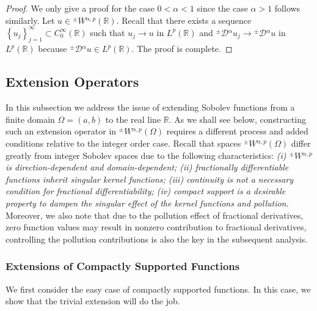 \documentclass[leqno,final]{siamltex}
\numberwithin{equation}{section}
\renewcommand{\(}{\bigl(}
\renewcommand{\)}{\bigr)}
\newcommand{\R}{\mathbb{R}}
\begin{document}
    \begin{proof}
        We only give a proof for the case $0<\alpha<1$ since the case $\alpha>1$ follows similarly. Let $u \in {^{\pm}}{W}{^{\alpha,p}}(\R)$. Recall that there exists a sequence $\left\{u_j \right\}_{j = 1}^{\infty} \subset C^{\infty}_{0}(\R)$ such that $u_j \rightarrow u$ in $L^{p}(\R)$ and ${^{\pm}}{\mathcal{D}}{^{\alpha}} u_j \rightarrow {^{\pm}}{\mathcal{D}}{^{\alpha}} u$ in $L^{p}(\R)$ because ${^{\pm}}{\mathcal{D}}{^{\alpha}} u \in L^{p}(\R)$. The proof is complete. 
    \end{proof}
    
    
    \subsection{Extension Operators}\label{sec-4.2}
    In this subsection we address the issue of extending Sobolev functions from a finite domain $\Omega=(a,b)$ to 
    the real line $\R$. As we shall see below, constructing such an extension operator in ${^{\pm}}{W}{^{\alpha,p}}(\Omega)$ requires a different process and added conditions relative to the integer order case. Recall that spaces ${^{\pm}}{W}{^{\alpha,p}}(\Omega)$ differ greatly from 
    integer Sobolev spaces due to the following characteristics: {\em 
    (i) ${^{\pm}}{W}{^{\alpha,p}}$ is direction-dependent  and domain-dependent;
    (ii) fractionally differentiable functions inherit singular kernel functions;
    (iii) continuity is not a necessary condition for fractional differentiability;
    (iv) compact support is a desirable property to dampen the singular effect of the kernel functions and pollution.}
    Moreover, we also note that due to the pollution effect 
    of fractional derivatives,  zero function values may result in nonzero 
    contribution to fractional derivatives, 
    controlling the pollution contributions is also the key in the subsequent analysis.  
   
 \subsubsection{\bf Extensions of Compactly Supported Functions}\label{sec-4.2.1}
    We first consider the easy case of compactly supported functions. In this case, we show that 
    the trivial extension will do the job. 
    
\end{document}
